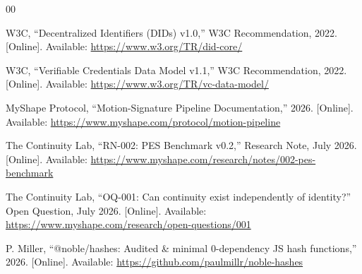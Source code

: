 \documentclass[conference]{IEEEtran}
\begin{document}
\begin{thebibliography}{00}

W3C, ``Decentralized Identifiers (DIDs) v1.0,'' W3C Recommendation, 2022. [Online]. Available: \url{https://www.w3.org/TR/did-core/}

W3C, ``Verifiable Credentials Data Model v1.1,'' W3C Recommendation, 2022. [Online]. Available: \url{https://www.w3.org/TR/vc-data-model/}

MyShape Protocol, ``Motion-Signature Pipeline Documentation,'' 2026. [Online]. Available: \url{https://www.myshape.com/protocol/motion-pipeline}

The Continuity Lab, ``RN-002: PES Benchmark v0.2,'' Research Note, July 2026. [Online]. Available: \url{https://www.myshape.com/research/notes/002-pes-benchmark}

The Continuity Lab, ``OQ-001: Can continuity exist independently of identity?'' Open Question, July 2026. [Online]. Available: \url{https://www.myshape.com/research/open-questions/001}

P. Miller, ``@noble/hashes: Audited \& minimal 0-dependency JS hash functions,'' 2026. [Online]. Available: \url{https://github.com/paulmillr/noble-hashes}

\end{thebibliography}
\end{document}
